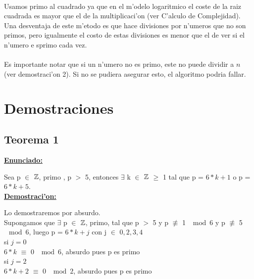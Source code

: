\paragraph{}
Usamos primo al cuadrado ya que en el m'odelo logaritmico el coste de la raiz cuadrada es mayor que el de la multiplicaci'on (ver C'alculo de Complejidad). Una desventaja de este m'etodo es que hace divisiones por n'umeros que no son primos, pero igualmente el costo de estas divisiones es menor que el de ver si el n'umero e sprimo cada vez.
\paragraph{}
Es importante notar que si un n'umero no es primo, este no puede dividir a $n$ (ver demostraci'on 2). Si 
no se pudiera asegurar esto, el algoritmo podria fallar.

\newpage
\section{Demostraciones}
\subsection{Teorema 1}
\label{demo1}

\textbf{\underline{Enunciado:}\\}

Sea p $\in$ ${\mathbb Z}$, primo , p $>$ 5, entonces $\exists$ k $\in$ ${\mathbb Z}$ $\geq$ 1  tal que p = $6*k+1$ o p = $6*k +5$.\\

\textbf{\underline{Demostraci'on:}\\}

Lo demostraremos por absurdo.\\ 

Supongamos que $\exists$ p $\in$ ${\mathbb Z}$, primo, tal que p $>$ 5 y p $\not\equiv$ 1  $\mod{6}$ y p
$\not\equiv$ 5  $\mod{6}$, luego p = $6*k + j$ con j $\in$ ${0,2,3,4}$ \\

si $j = 0$\\

$6*k$ $\equiv$ 0  $\mod{6}$, absurdo pues p es primo\\

si $j = 2$\\

$6*k + 2$ $\equiv$ 0  $\mod{2}$, absurdo pues p es primo \\

